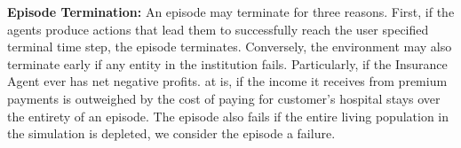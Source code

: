 \textbf{Episode Termination:} An episode may terminate for three reasons. First, if the agents produce actions that lead them to successfully reach the user specified terminal time step, the episode terminates. Conversely, the environment may also terminate early if any entity in the institution fails. Particularly, if the Insurance Agent ever has net negative profits. at is, if the income it receives from premium payments is outweighed by the cost of paying for customer's hospital stays over the entirety of an episode. The episode also fails if the entire living population in the simulation is depleted, we consider the episode a failure.